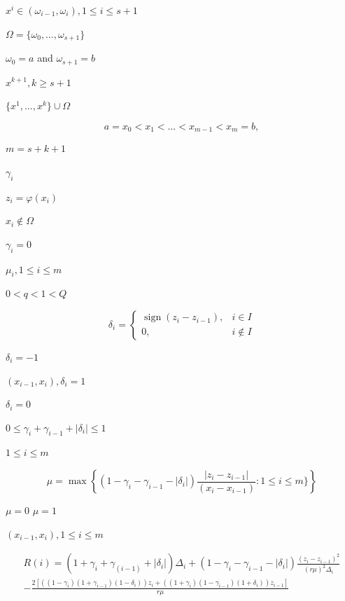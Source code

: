 \documentclass[runningheads]{llncs}
\newcommand{\sign}{\operatorname{sign}}
\begin{document}
$x^i \in (\omega_{i-1},\omega_i ),1 \leq i \leq s+1$

$\Omega=\{\omega_0,…,\omega_{s+1}\}$

$\omega_0=a$ and $\omega_{s+1}=b$

$x^{k+1}, k \geq s+1$

$\{x^1,...,x^k\} \cup \Omega$

\begin{equation}\label{x_cond}
 a=x_0<x_1<...<x_{m-1}<x_m=b,
\end{equation}

$m=s+k+1$

$\gamma_i$

$z_i=\varphi(x_i )$

$ x_i \not\in \Omega$

$\gamma_i=0$

$\mu_i,1 \leq i \leq m$

$0<q<1<Q$

\begin{equation}\label{delta_cond}
\delta_i=
\begin{cases}
	\sign{(z_i - z_{i-1})}, &\text{$i \in I$} \\
	0, &\text{$i \not \in I$}
\end{cases}
\end{equation}

$\delta_i=-1$

$(x_{i-1},x_i ), \delta_i=1$

$\delta_i=0$

$ 0 \leq \gamma_i+\gamma_{i-1}+|\delta_i | \leq 1$

$1 \leq i \leq m$

\begin{equation}\label{mu_new}
\mu=\max\left\{(1-\gamma_i-\gamma_{i-1}-|\delta_i|) \frac {|z_i-z_{i-1}|}{(x_i-x_{i-1})}: 1 \leq i \leq m\}\right\}
\end{equation}

$\mu=0$ $\mu=1$

$(x_{i-1},x_i), 1 \leq i \leq m$

\begin{equation}\label{mu_new}
\begin{gathered}
R(i)=(1+\gamma_i+\gamma_(i-1)+|\delta_i |) \Delta_i+(1-\gamma_i-\gamma_{i-1}-|\delta_i |)\frac{(z_i-z_{i-1} )^2}{(r\mu)^2 \Delta_i } \\
- \frac{2[((1-\gamma_i )(1+\gamma_{i-1} )(1-\delta_i )) z_i+((1+\gamma_i )(1-\gamma_{i-1} )(1+\delta_i )) z_{i-1} ]}{r\mu}
\end{gathered}
\end{equation}
\end{document}

